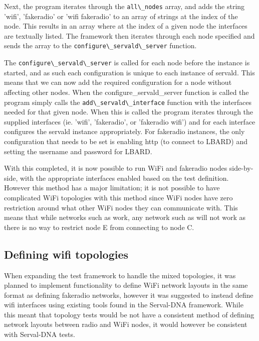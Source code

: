 Next, the program iterates through the \verb|all\_nodes| array, and adds the string 'wifi', 'fakeradio' or 'wifi fakeradio' to an array of strings at the index of the node.
This results in an array where at the index of a given node the interfaces are textually listed.
The framework then iterates through each node specified and sends the array to the \verb|configure\_servald\_server| function.


The \verb|configure\_servald\_server| is called for each node before the instance is started, and as such each configuration is unique to each instance of servald.
This means that we can now add the required configuration for a node without affecting other nodes.
When the configure\_servald\_server function is called the program simply calls the \verb|add\_servald\_interface| function with the interfaces needed for that given node.
When this is called the program iterates through the supplied interfaces (ie. 'wifi', 'fakeradio', or 'fakeradio wifi') and for each interface configures the servald instance appropriately.
For fakeradio instances, the only configuration that needs to be set is enabling http (to connect to LBARD) and setting the username and password for LBARD.

With this completed, it is now possible to run WiFi and fakeradio nodes side-by-side, with the appropriate interfaces enabled based on the test definition.
However this method has a major limitation; it is not possible to have complicated WiFi topologies with this method since WiFi nodes have zero restriction around what other WiFi nodes they can communicate with.
This means that while networks such as  work, any network such as  will not work as there is no way to restrict node E from connecting to node C.



\subsection{Defining wifi topologies}
When expanding the test framework to handle the mixed topologies, it was planned to implement functionality to define WiFi network layouts in the same format as defining fakeradio networks, however it was suggested to instead define wifi interfaces using existing tools found in the Serval-DNA framework.
While this meant that topology tests would be not have a consistent method of defining network layouts between radio and WiFi nodes, it would however be consistent with Serval-DNA tests.

